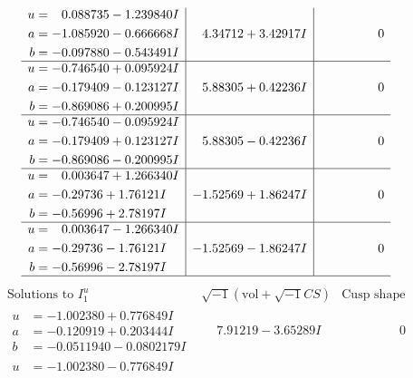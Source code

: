 \documentclass[1p]{elsarticle_modified}
\theoremstyle{definition}
\newcommand{\I}{\sqrt{-1}}
\begin{document}
$$\begin{array}{c|c|c}
\begin{aligned}
u &= \phantom{-}0.088735 - 1.239840 I \\
a &= -1.085920 - 0.666668 I \\
b &= -0.097880 - 0.543491 I\end{aligned}
 & \phantom{-}4.34712 + 3.42917 I & \phantom{-0.000000 } 0 \\ \hline\begin{aligned}
u &= -0.746540 + 0.095924 I \\
a &= -0.179409 - 0.123127 I \\
b &= -0.869086 + 0.200995 I\end{aligned}
 & \phantom{-}5.88305 + 0.42236 I & \phantom{-0.000000 } 0 \\ \hline\begin{aligned}
u &= -0.746540 - 0.095924 I \\
a &= -0.179409 + 0.123127 I \\
b &= -0.869086 - 0.200995 I\end{aligned}
 & \phantom{-}5.88305 - 0.42236 I & \phantom{-0.000000 } 0 \\ \hline\begin{aligned}
u &= \phantom{-}0.003647 + 1.266340 I \\
a &= -0.29736 + 1.76121 I \\
b &= -0.56996 + 2.78197 I\end{aligned}
 & -1.52569 + 1.86247 I & \phantom{-0.000000 } 0 \\ \hline\begin{aligned}
u &= \phantom{-}0.003647 - 1.266340 I \\
a &= -0.29736 - 1.76121 I \\
b &= -0.56996 - 2.78197 I\end{aligned}
 & -1.52569 - 1.86247 I & \phantom{-0.000000 } 0\\
 \hline 
 \end{array}$$\newpage$$\begin{array}{c|c|c}  
\text{Solutions to }I^u_{1}& \I (\text{vol} + \sqrt{-1}CS) & \text{Cusp shape}\\
 \hline 
\begin{aligned}
u &= -1.002380 + 0.776849 I \\
a &= -0.120919 + 0.203444 I \\
b &= -0.0511940 - 0.0802179 I\end{aligned}
 & \phantom{-}7.91219 - 3.65289 I & \phantom{-0.000000 } 0 \\ \hline\begin{aligned}
u &= -1.002380 - 0.776849 I \\

\end{aligned}
\end{array}$$
\end{document}
